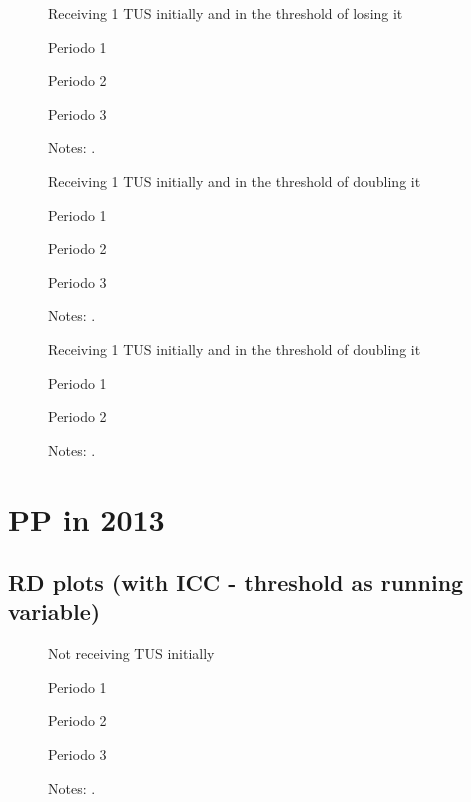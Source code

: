\documentclass[12pt]{article}
\begin{document}
\begin{figure}[H]%
	\caption{Receiving 1 TUS initially and in the threshold of losing it}%
	\centering
	\caption*{ {Periodo 1}}
	\qquad
	\caption*{Periodo 2}
	\qquad
	\caption*{Periodo 3}
	\label{fig:pp2016_prim_1TUS.pdf}%
	\caption*{ {\footnotesize Notes: .}}
\end{figure}

\begin{figure}[H]%
	\caption{Receiving 1 TUS initially and in the threshold of doubling it}%
	\centering
	\caption*{ {Periodo 1}}
	\qquad
	\caption*{Periodo 2}
	\qquad
	\caption*{Periodo 3}
	\label{fig:pp2016_seg_1TUS.pdf}%
	\caption*{ {\footnotesize Notes: .}}
\end{figure}

\begin{figure}[H]%
	\caption{Receiving 1 TUS initially and in the threshold of doubling it}%
	\centering
	\caption*{ {Periodo 1}}
	\qquad
	\caption*{Periodo 2}
	\label{fig:pp2016_seg_2TUS.pdf}%
	\caption*{ {\footnotesize Notes: .}}
\end{figure}


\section{PP in 2013}

\subsection{RD plots (with ICC - threshold as running variable)}
\begin{figure}[H]%
	\caption{Not receiving TUS initially}%
	\centering
	\caption*{ {Periodo 1}}
	\caption*{Periodo 2}
	\qquad
	\caption*{Periodo 3}
	\label{fig:pp2013_prim_0TUS.png}%
	\caption*{ {\footnotesize Notes: .}}
\end{figure}
\end{document}
